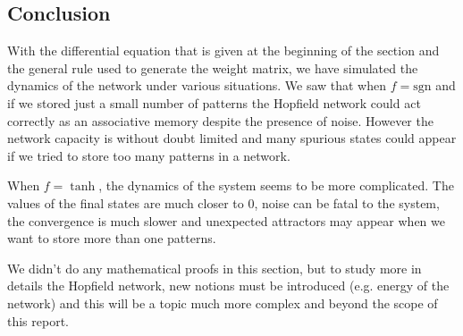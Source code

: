 \subsection{Conclusion}
With the differential equation that is given at the beginning of the
section and the general rule used to generate the weight matrix, 
we have simulated the dynamics of the network under various situations. 
We saw that when $f = \mathrm{sgn}$ and if we stored just a small number
of patterns the Hopfield network could act correctly as an associative 
memory despite the presence of noise.
However the network capacity is without doubt limited and many spurious
states could appear if we tried to store too many patterns in a network.

When $f = \tanh$, the dynamics of the system seems to be more complicated.
The values of the final states are much closer to 0, noise can be fatal to
the system, the convergence is much slower and unexpected attractors
may appear when we want to store more than one patterns.

We didn't do any mathematical proofs in this section, but to study more
in details the Hopfield network, new notions must be introduced (e.g.
energy of the network) and this will be a topic much more complex and
beyond the scope of this report.

